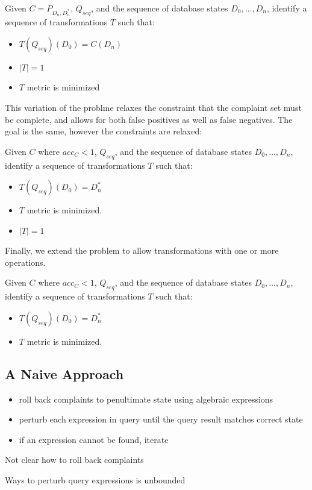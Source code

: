 {\begin{problem}\label{prob:complete}
Given $C = P_{D_n, D^*_n}$, $Q_{seq}$, and the sequence of database states $D_0,\ldots,D_n$, 
identify a sequence of transformations $T$ such that:
\begin{itemize}
\item $T(Q_{seq})(D_0) = C(D_n)$
\item $|T| = 1$
\item $T$ metric is minimized
\end{itemize}
\end{problem}

This variation of the problme relaxes the constraint that the complaint set must be complete, and allows
for both false positives as well as false negatives.  The goal is the same, however the constraints are relaxed:

\begin{problem}\label{prob:incomplete}
Given $C$ where $acc_C < 1$, $Q_{seq}$, and the sequence of database states $D_0,\ldots,D_n$, 
identify a sequence of transformations $T$ such that:
\begin{itemize}
\item $T(Q_{seq})(D_0) = D^*_n$
\item $T$ metric is minimized.
\item $|T| = 1$
\end{itemize}
\end{problem}

Finally, we extend the problem to allow transformations with one or more operations.

\begin{problem}\label{prob:multi}
Given $C$ where $acc_C < 1$, $Q_{seq}$, and the sequence of database states $D_0,\ldots,D_n$, 
identify a sequence of transformations $T$ such that:
\begin{itemize}
\item $T(Q_{seq})(D_0) = D^*_n$
\item $T$ metric is minimized.
\end{itemize}
\end{problem}




\subsection{A Naive Approach}

\begin{itemize}
\item roll back complaints to penultimate state using algebraic expressions 
\item perturb each expression in query until the query result matches correct state
\item if an expression cannot be found, iterate
\end{itemize}


Not clear how to roll back complaints

Ways to perturb query expressions is unbounded

}